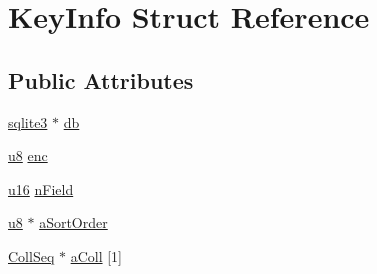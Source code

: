 \hypertarget{struct_key_info}{\section{Key\-Info Struct Reference}
\label{struct_key_info}
}
\subsection*{Public Attributes}
\begin{DoxyCompactItemize}
\item 
\hyperlink{structsqlite3}{sqlite3} $\ast$ \hyperlink{struct_key_info_af2e7a3a411f5ca1ccf6de77d320b59db}{db}
\item 
\hyperlink{sqlite3_8c_a74a0f6424ae628af25f23f0a35f6ead3}{u8} \hyperlink{struct_key_info_a37972825f9a148668e979be12465e832}{enc}
\item 
\hyperlink{sqlite3_8c_a20f2299e322dcbde37cb07b16910b843}{u16} \hyperlink{struct_key_info_af70436487a95e445d540bfc4ca1d3f0b}{n\-Field}
\item 
\hyperlink{sqlite3_8c_a74a0f6424ae628af25f23f0a35f6ead3}{u8} $\ast$ \hyperlink{struct_key_info_ac5fe4bd0172a1f11f41f678528a7b21e}{a\-Sort\-Order}
\item 
\hyperlink{struct_coll_seq}{Coll\-Seq} $\ast$ \hyperlink{struct_key_info_ad43aa024fca5a065e75d8e24b231adcb}{a\-Coll} \mbox{[}1\mbox{]}
\end{DoxyCompactItemize}


